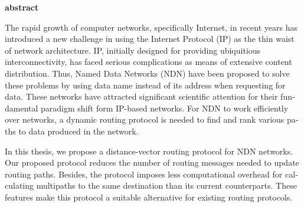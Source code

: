 

\pagestyle{empty}

\begin{latin}

\EnglishAbstractFont

\begin{center}
\textbf{abstract}
\end{center}

The rapid growth of computer networks, specifically Internet, in recent years has introduced a new challenge in using the Internet Protocol (IP) as the thin waist of network architecture. IP, initially designed for providing ubiquitious interconnectivity, has faced serious complications as means of extensive content distribution. Thus, Named Data Networks (NDN) have been proposed to solve these problems by using data name instead of its address when requesting for data. These networks have attracted significant scientific attention for their fundamental paradigm shift form IP-based networks. For NDN to work efficiently over networks, a dynamic routing protocol is needed to find and rank various paths to data produced in the network.

In this thesis, we propose a distance-vector routing protocol for NDN networks. Our proposed protocol reduces the number of routing messages needed to update routing paths. Besides, the protocol imposes less computational overhead for calculating multipaths to the same destination than its current counterparts. These features make this protocol a suitable alternative for existing routing protocols.
\end{latin}

\newpage
